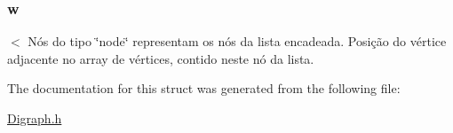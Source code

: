 \subsubsection[{\texorpdfstring{w}{w}}]{ w}\hypertarget{structnode_ac6c3e84cdc714053b54b0d3e63abc3b3}{}\label{structnode_ac6c3e84cdc714053b54b0d3e63abc3b3}
$<$ Nós do tipo \char`\"{}node\char`\"{} representam os nós da lista encadeada. Posição do vértice adjacente no array de vértices, contido neste nó da lista. 

The documentation for this struct was generated from the following file\+:\begin{DoxyCompactItemize}
\item 
\hyperlink{_digraph_8h}{Digraph.\+h}\end{DoxyCompactItemize}
